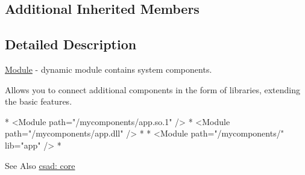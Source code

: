 \subsection*{Additional Inherited Members}


\subsection{Detailed Description}
\hyperlink{classcsad_1_1_module}{Module} -\/ dynamic module contains system components. 

Allows you to connect additional components in the form of libraries, extending the basic features.

\begin{DoxyVerb}* <Module path="/mycomponents/app.so.1" />
* <Module path="/mycomponents/app.dll" />
*
* <Module path="/mycomponents/" lib="app" />
* \end{DoxyVerb}


\begin{DoxySeeAlso}{See Also}
\hyperlink{group__core}{csad\-: core} 
\end{DoxySeeAlso}

